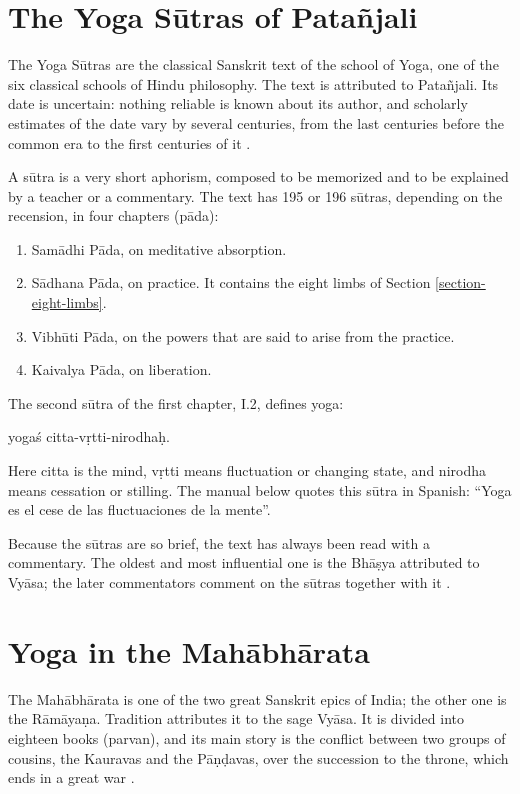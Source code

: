 \section{The Yoga Sūtras of Patañjali}
\label{section-yoga-sutras}

The Yoga Sūtras are the classical Sanskrit
text of the school of Yoga, one of the six
classical schools of Hindu philosophy. The
text is attributed to Patañjali. Its date is
uncertain: nothing reliable is known about
its author, and scholarly estimates of the
date vary by several centuries, from the last
centuries before the common era to the first
centuries of it \cite{bryant-yoga-sutras}.

A sūtra is a very short aphorism, composed to
be memorized and to be explained by a teacher
or a commentary. The text has 195 or 196
sūtras, depending on the recension, in four
chapters (pāda):
\begin{enumerate}
\item Samādhi Pāda, on meditative absorption.
\item Sādhana Pāda, on practice. It contains
the eight limbs of Section
\ref{section-eight-limbs}.
\item Vibhūti Pāda, on the powers that are
said to arise from the practice.
\item Kaivalya Pāda, on liberation.
\end{enumerate}

The second sūtra of the first chapter, I.2,
defines yoga:
\begin{center}
yogaś citta-vṛtti-nirodhaḥ.
\end{center}
Here citta is the mind, vṛtti means
fluctuation or changing state, and nirodha
means cessation or stilling. The manual below
quotes this sūtra in Spanish: ``Yoga es el
cese de las fluctuaciones de la mente''.

Because the sūtras are so brief, the text has
always been read with a commentary. The
oldest and most influential one is the
Bhāṣya attributed to Vyāsa; the later
commentators comment on the sūtras together
with it \cite{bryant-yoga-sutras}.

\section{Yoga in the Mahābhārata}
\label{section-yoga-in-the-mahabharata}

The Mahābhārata is one of the two great
Sanskrit epics of India; the other one is the
Rāmāyaṇa. Tradition attributes it to the sage
Vyāsa. It is divided into eighteen books
(parvan), and its main story is the conflict
between two groups of cousins, the Kauravas
and the Pāṇḍavas, over the succession to the
throne, which ends in a great war
\cite{van-buitenen-mahabharata-1}.

